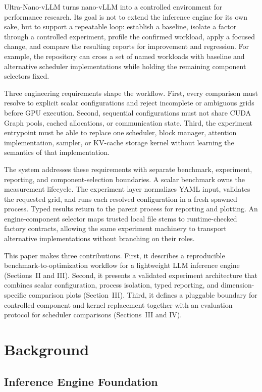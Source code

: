\documentclass[conference]{IEEEtran}
\begin{document}
Ultra-Nano-vLLM turns nano-vLLM into a controlled environment for performance
research. Its goal is not to extend the inference engine for its own sake, but
to support a repeatable loop: establish a baseline, isolate a factor through a
controlled experiment, profile the confirmed workload, apply a focused change,
and compare the resulting reports for improvement and regression. For example,
the repository can cross a set of named workloads with baseline and alternative
scheduler implementations while holding the remaining component selectors
fixed.

Three engineering requirements shape the workflow. First, every comparison
must resolve to explicit scalar configurations and reject incomplete or
ambiguous grids before GPU execution. Second, sequential configurations must
not share CUDA Graph pools, cached allocations, or communication state. Third,
the experiment entrypoint must be able to replace one scheduler, block manager,
attention implementation, sampler, or KV-cache storage kernel without learning
the semantics of that implementation.

The system addresses these requirements with separate benchmark, experiment,
reporting, and component-selection boundaries. A scalar benchmark owns the
measurement lifecycle. The experiment layer normalizes YAML input, validates
the requested grid, and runs each resolved configuration in a fresh spawned
process. Typed results return to the parent process for reporting and plotting.
An engine-component selector maps trusted local file stems to runtime-checked
factory contracts, allowing the same experiment machinery to transport
alternative implementations without branching on their roles.

This paper makes three contributions. First, it describes a reproducible
benchmark-to-optimization workflow for a lightweight LLM inference engine
(Sections~II and III). Second, it presents a validated experiment architecture
that combines scalar configuration, process isolation, typed reporting, and
dimension-specific comparison plots (Section~III). Third, it defines a
pluggable boundary for controlled component and kernel replacement together
with an evaluation protocol for scheduler comparisons (Sections~III and IV).

\section{Background}

\subsection{Inference Engine Foundation}
\end{document}
